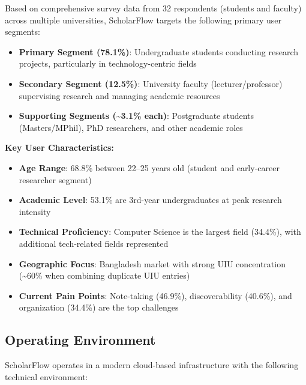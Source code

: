 Based on comprehensive survey data from 32 respondents (students and faculty) across multiple universities, ScholarFlow targets the following primary user segments:

\begin{itemize}[leftmargin=*]
    \item \textbf{Primary Segment (78.1\%)}: Undergraduate students conducting research projects, particularly in technology-centric fields
    \item \textbf{Secondary Segment (12.5\%)}: University faculty (lecturer/professor) supervising research and managing academic resources
    \item \textbf{Supporting Segments (\textasciitilde{}3.1\% each)}: Postgraduate students (Masters/MPhil), PhD researchers, and other academic roles
\end{itemize}

\textbf{Key User Characteristics:}
\begin{itemize}
    \item \textbf{Age Range}: 68.8\% between 22--25 years old (student and early-career researcher segment)
    \item \textbf{Academic Level}: 53.1\% are 3rd-year undergraduates at peak research intensity
    \item \textbf{Technical Proficiency}: Computer Science is the largest field (34.4\%), with additional tech-related fields represented
    \item \textbf{Geographic Focus}: Bangladesh market with strong UIU concentration (\textasciitilde{}60\% when combining duplicate UIU entries)
    \item \textbf{Current Pain Points}: Note-taking (46.9\%), discoverability (40.6\%), and organization (34.4\%) are the top challenges
\end{itemize}

\subsection{Operating Environment}

ScholarFlow operates in a modern cloud-based infrastructure with the following technical environment:


